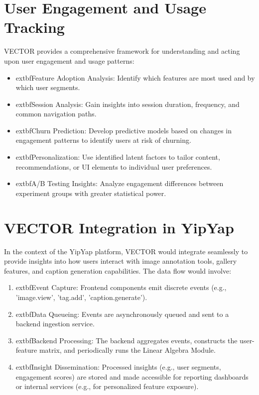 \documentclass[10pt]{article}
\begin{document}
\section{User Engagement and Usage Tracking}
VECTOR provides a comprehensive framework for understanding and acting upon user engagement and usage patterns:
\begin{itemize}
    \item 	extbf{Feature Adoption Analysis}: Identify which features are most used and by which user segments.
    \item 	extbf{Session Analysis}: Gain insights into session duration, frequency, and common navigation paths.
    \item 	extbf{Churn Prediction}: Develop predictive models based on changes in engagement patterns to identify users at risk of churning.
    \item 	extbf{Personalization}: Use identified latent factors to tailor content, recommendations, or UI elements to individual user preferences.
    \item 	extbf{A/B Testing Insights}: Analyze engagement differences between experiment groups with greater statistical power.
\end{itemize}

\section{VECTOR Integration in YipYap}
In the context of the YipYap platform, VECTOR would integrate seamlessly to provide insights into how users interact with image annotation tools, gallery features, and caption generation capabilities.
The data flow would involve:
\begin{enumerate}
    \item 	extbf{Event Capture}: Frontend components emit discrete events (e.g., 'image.view', 'tag.add', 'caption.generate').
    \item 	extbf{Data Queueing}: Events are asynchronously queued and sent to a backend ingestion service.
    \item 	extbf{Backend Processing}: The backend aggregates events, constructs the user-feature matrix, and periodically runs the Linear Algebra Module.
    \item 	extbf{Insight Dissemination}: Processed insights (e.g., user segments, engagement scores) are stored and made accessible for reporting dashboards or internal services (e.g., for personalized feature exposure).
\end{enumerate}
\end{document}
